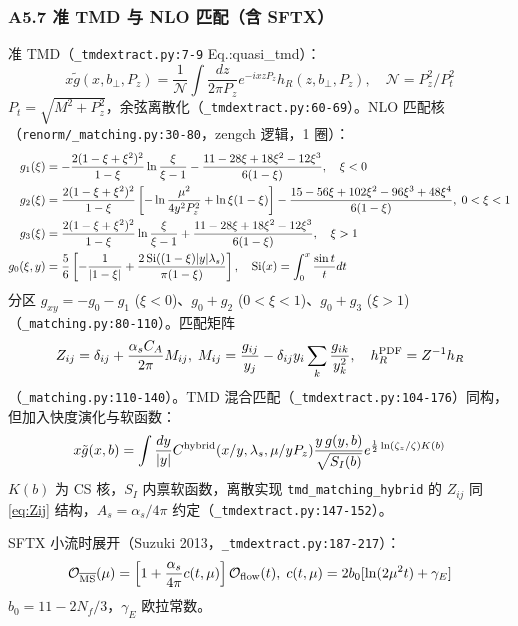 \documentclass[UTF8]{ctexart}
\begin{document}
\subsubsection{A5.7 准 TMD 与 NLO 匹配（含 SFTX）}
准 TMD（\texttt{\nolinkurl{\_tmdextract.py:7-9}} Eq.:quasi\_tmd）：
\begin{equation}
x\tilde g(x,b_\perp,P_z)=\frac1{\mathcal{N}}\int\frac{dz}{2\pi P_z}e^{-ixzP_z}h_R(z,b_\perp,P_z),\quad \mathcal{N}=P_z^2/P_t^2
\label{eq:quasiTMD}
\end{equation}
$P_t=\sqrt{M^2+P_z^2}$，余弦离散化（\texttt{\nolinkurl{\_tmdextract.py:60-69}}）。NLO 匹配核（\texttt{\nolinkurl{renorm/\_matching.py:30-80}}，zengch 逻辑，1 圈）：
\begin{align}
g_1(\xi)&=-\frac{2(1-\xi+\xi^2)^2}{1-\xi}\ln\frac{\xi}{\xi-1}-\frac{11-28\xi+18\xi^2-12\xi^3}{6(1-\xi)},\quad \xi<0 \nonumber\\
g_2(\xi)&=\frac{2(1-\xi+\xi^2)^2}{1-\xi}\left[-\ln\frac{\mu^2}{4y^2P_z^2}+\ln\xi(1-\xi)\right]-\frac{15-56\xi+102\xi^2-96\xi^3+48\xi^4}{6(1-\xi)},\;0<\xi<1 \nonumber\\
g_3(\xi)&=\frac{2(1-\xi+\xi^2)^2}{1-\xi}\ln\frac{\xi}{\xi-1}+\frac{11-28\xi+18\xi^2-12\xi^3}{6(1-\xi)},\quad \xi>1 \label{eq:g123}\\
g_0(\xi,y)&=\frac56\left[-\frac1{|1-\xi|}+\frac{2\,{\rm Si}((1-\xi)|y|\lambda_s)}{\pi(1-\xi)}\right],\quad {\rm Si}(x)=\int_0^x\frac{\sin t}{t}dt \nonumber
\end{align}
分区 $g_{xy}= -g_0-g_1$ ($\xi<0$)、$g_0+g_2$ ($0<\xi<1$)、$g_0+g_3$ ($\xi>1$)（\texttt{\nolinkurl{\_matching.py:80-110}}）。匹配矩阵
\begin{equation}
Z_{ij}=\delta_{ij}+\frac{\alpha_s C_A}{2\pi}M_{ij},\;M_{ij}=\frac{g_{ij}}{y_j}-\delta_{ij}y_i\sum_k\frac{g_{ik}}{y_k^2},\quad h_R^{\rm PDF}=Z^{-1}h_R
\label{eq:Zij}
\end{equation}
（\texttt{\nolinkurl{\_matching.py:110-140}}）。TMD 混合匹配（\texttt{\nolinkurl{\_tmdextract.py:104-176}}）同构，但加入快度演化与软函数：
\begin{equation}
x\tilde g(x,b)=\int\frac{dy}{|y|}C^{\rm hybrid}(x/y,\lambda_s,\mu/yP_z)\frac{y\,g(y,b)}{\sqrt{S_I(b)}}e^{\frac12\ln(\zeta_z/\zeta)K(b)}
\label{eq:TMDmatch}
\end{equation}
$K(b)$ 为 CS 核，$S_I$ 内禀软函数，离散实现 \texttt{\nolinkurl{tmd\_matching\_hybrid}} 的 $Z_{ij}$ 同 \eqref{eq:Zij} 结构，$A_s=\alpha_s/4\pi$ 约定（\texttt{\nolinkurl{\_tmdextract.py:147-152}}）。

SFTX 小流时展开（Suzuki 2013，\texttt{\nolinkurl{\_tmdextract.py:187-217}}）：
\begin{equation}
\mathcal{O}_{\overline{\rm MS}}(\mu)=\left[1+\frac{\alpha_s}{4\pi}c(t,\mu)\right]\mathcal{O}_{\rm flow}(t),\;c(t,\mu)=2b_0[\ln(2\mu^2t)+\gamma_E]
\label{eq:SFTX}
\end{equation}
$b_0=11-2N_f/3$，$\gamma_E$ 欧拉常数。
\end{document}

